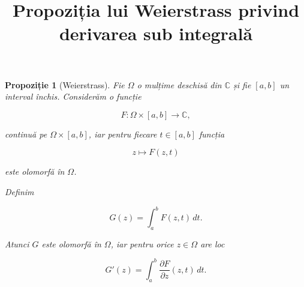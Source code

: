 \documentclass[12pt]{article}
\title{\Large\textbf{Propoziția lui Weierstrass privind derivarea sub integrală}}
\date{}
\theoremstyle{plain}
\newtheorem{proposition}{Propoziție}
\begin{document}
\maketitle

\begin{proposition}[Weierstrass]
Fie $\Omega$ o mulțime deschisă din $\mathbb{C}$ și fie $[a,b]$ un interval închis.  
Considerăm o funcție


\[
F : \Omega \times [a,b] \to \mathbb{C},
\]


continuă pe $\Omega \times [a,b]$, iar pentru fiecare $t \in [a,b]$ funcția


\[
z \mapsto F(z,t)
\]


este olomorfă în $\Omega$.

Definim


\[
G(z) = \int_a^b F(z,t)\, dt.
\]



Atunci $G$ este olomorfă în $\Omega$, iar pentru orice $z \in \Omega$ are loc


\[
G'(z) = \int_a^b \frac{\partial F}{\partial z}(z,t)\, dt.
\]


\end{proposition}
\end{document}
